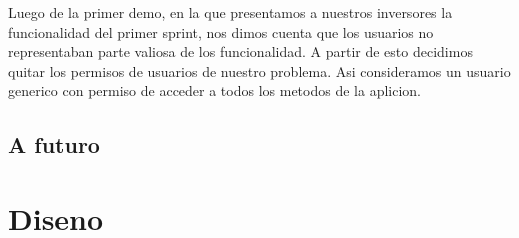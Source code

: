 \documentclass[10pt,a4paper]{article}
\begin{document}
Luego de la primer demo, en la que presentamos a nuestros inversores la funcionalidad del primer sprint, nos dimos cuenta que los usuarios 
no representaban parte valiosa de los funcionalidad. A partir de esto decidimos quitar los permisos de usuarios de nuestro problema. Asi consideramos un usuario generico con permiso de 
acceder a todos los metodos de la aplicion.

\subsection{A futuro}



\section{Diseno}


\end{document}
